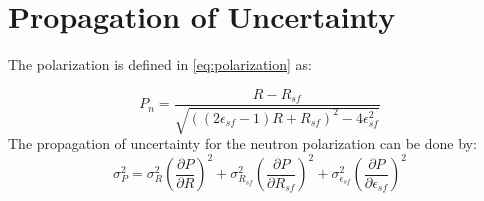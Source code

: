 \chapter{Propagation of Uncertainty} \label{app:error}

The polarization is defined in \cref{eq:polarization} as:

\begin{equation}
    P_n = \frac{R- R_{sf}}{\sqrt{\left( \left(2\epsilon_{sf}-1 \right)R+R_{sf}\right)^2-4\epsilon_{sf}^2}}
\end{equation}
The propagation of uncertainty for the neutron polarization can be done by:
\begin{equation}
    \sigma_P^2 = \sigma_R^2 \left(\frac{\partial P}{\partial R}\right)^{2}+ \sigma_{R_{sf}}^2 \left(\frac{\partial P}{\partial R_{sf}}\right)^{2} + \sigma_{\epsilon_{sf}}^2 \left(\frac{\partial P}{\partial \epsilon_{sf}}\right)^{2}
\end{equation}

